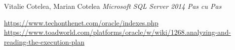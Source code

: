 \begin{thebibliography}{99999}
\singlespace\normalsize

\bibitem{} 
Vitalie Cotelea, Marian Cotelea
\textit{Microsoft SQL Server 2014 Pas cu Pas}

\bibitem{} \url{https://www.techonthenet.com/oracle/indexes.php}
\bibitem{} \url{https://www.toadworld.com/platforms/oracle/w/wiki/1268.analyzing-and-reading-the-execution-plan}

\end{thebibliography}


